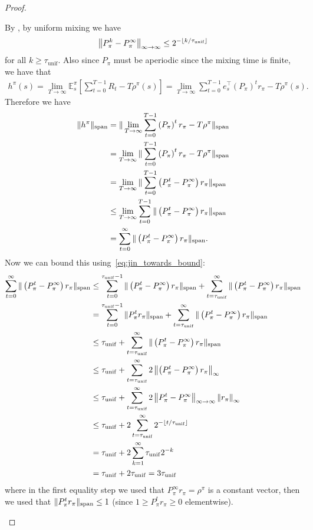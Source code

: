 \documentclass{article}
\theoremstyle{plain}
\theoremstyle{plain}
\theoremstyle{remark}
\theoremstyle{plain}
\theoremstyle{plain}
\newcommand{\E}{\mathbb{E}}
\newcommand{\tmix}{\tau_{\mathrm{unif}}}
\begin{document}
\begin{proof}
\begin{enumerate}
        By \cite[Lemma 1]{jin_towards_2021}, by uniform mixing we have
        \begin{align}
            \infinfnorm{P_\pi^k - P_\pi^\infty } \leq 2^{- \lfloor k/\tmix \rfloor} \label{eq:jin_towards_bound}
        \end{align}
        for all $k \geq \tmix$. Also since $P_\pi$ must be aperiodic since the mixing time is finite, we have \citep{puterman_markov_1994} that
        \begin{align*}
            h^{\pi}(s) = \lim_{T \to \infty} \E^\pi_s \left[\sum_{t=0}^{T-1}R_t - T \rho^\pi(s) \right] =  \lim_{T \to \infty}\sum_{t=0}^{T-1} e_s^\top \left(P_\pi \right)^t r_\pi - T \rho^\pi(s).
        \end{align*}
        Therefore we have
        \begin{align*}
            \Vert h^\pi\Vert _{\textnormal{span}} &= \Vert  \lim_{T \to \infty} \sum_{t=0}^{T-1} \left(P_\pi \right)^t r_\pi - T \rho^\pi\Vert _{\textnormal{span}} \\
        &=  \lim_{T \to \infty} \Vert \sum_{t=0}^{T-1} \left(P_\pi \right)^t r_\pi - T \rho^\pi\Vert _{\textnormal{span}} \\
        &=  \lim_{T \to \infty} \Vert \sum_{t=0}^{T-1} \left(P_\pi^t  -  P_\pi^\infty  \right) r_\pi\Vert _{\textnormal{span}} \\
        &\leq  \lim_{T \to \infty} \sum_{t=0}^{T-1} \Vert  \left(P_\pi^t  -  P_\pi^\infty  \right) r_\pi\Vert _{\textnormal{span}} \\
        &=   \sum_{t=0}^{\infty} \Vert  \left(P_\pi^t  -  P_\pi^\infty  \right) r_\pi\Vert _{\textnormal{span}}.
        \end{align*}
        Now we can bound this using~\eqref{eq:jin_towards_bound}:
        \begin{align*}
            \sum_{t=0}^{\infty} \spannorm{ \left(P_\pi^t  -  P_\pi^\infty  \right) r_\pi} & \leq  \sum_{t=0}^{\tmix-1} \spannorm{ \left(P_\pi^t -  P_\pi^\infty  \right) r_\pi} +  \sum_{t=\tmix}^{\infty} \spannorm{ \left(P_\pi^t  -  P_\pi^\infty  \right) r_\pi} \\
            & = \sum_{t=0}^{\tmix-1} \spannorm{ P_\pi^t r_\pi} +  \sum_{t=\tmix}^{\infty} \spannorm{ \left(P_\pi^t -  P_\pi^\infty  \right) r_\pi} \\
            & \leq \tmix +  \sum_{t=\tmix}^{\infty} \spannorm{ \left(P_\pi^t -  P_\pi^\infty  \right) r_\pi} \\
            & \leq  \tmix + \sum_{t=\tmix}^{\infty} 2\infnorm{ \left(P_\pi^t -  P_\pi^\infty  \right) r_\pi} \\
            & \leq  \tmix + \sum_{t=\tmix}^{\infty} 2\infinfnorm{ P_\pi^t -  P_\pi^\infty  } \infnorm{r_\pi} \\
            & \leq  \tmix + 2\sum_{t=\tmix}^{\infty} 2^{- \lfloor t/\tmix \rfloor}  \\
            & = \tmix + 2\sum_{k=1}^{\infty} \tmix 2^{- k} \\
            &=  \tmix + 2\tmix = 3 \tmix
        \end{align*}
        where in the first equality step we used that $P_\pi^\infty r_\pi = \rho^\pi$ is a constant vector, then we used that $ \Vert  P_\pi^t r_\pi\Vert _{\textnormal{span}} \leq 1$ (since $1 \geq P_\pi^t r_\pi \geq 0$ elementwise).


\end{enumerate}
\end{proof}
\end{document}
